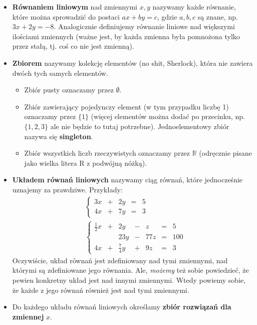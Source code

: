\documentclass{article}
\theoremstyle{remark}
\begin{document}
\begin{itemize}
  \item \textbf{Równaniem liniowym} nad zmiennymi $x, y$ 
  nazywamy każde równanie, które można sprowadzić do postaci
  $ax + by = c$, gdzie $a, b, c$ są znane, np. $3x+2y=-8$. 
  Analogicznie definiujemy równanie liniowe 
  nad większymi ilościami zmiennych 
  (ważne jest, by każda zmienna była pomnożona tylko przez
   stałą, tj. coś co nie jest zmienną).
  \item \textbf{Zbiorem} nazywamy kolekcję elementów (no shit, Sherlock), 
    która nie zawiera dwóch tych samych elementów.
  \begin{itemize}
    \item Zbiór pusty oznaczamy przez $\emptyset$.
    \item Zbiór zawierający pojedynczy element (w tym przypadku liczbę 1)
  oznaczamy przez $\{1\}$ (więcej elementów można dodać po przecinku, np. $\{1, 2, 3\}$
  ale nie będzie to tutaj potrzebne). Jednoelementowy zbiór nazywa się \textbf{singleton}.
    \item Zbiór wszystkich liczb rzeczywistych oznaczamy przez $\mathbb R$ 
  (odręcznie pisane jako wielka litera R z podwójną nóżką).
  \end{itemize}
  \item \textbf{Układem równań liniowych} nazywamy ciąg równań, które jednocześnie uznajemy za prawdziwe.
  Przykłady:
  \begin{align*}
    &\left\{ 
    \begin{array}{lllll}
      3x &+& 2y &=& 5\\
      4x &+& 7y &=& 3
    \end{array}
    \right. \\
    &\left\{ 
    \begin{array}{lllllll}
      \tfrac12x &+& 2y &-&z &=& 5\\
       && 23y &-&77z &=& 100\\
      4x &+& \tfrac74y &+&9z &=& 3
    \end{array}
    \right.
  \end{align*}
  Oczywiście, układ równań jest zdefiniowany nad tymi zmiennymi, nad 
  którymi są zdefiniowane jego równania. 
  Ale, \textit{możemy} też sobie powiedzieć, 
  że pewien konkretny układ jest nad innymi zmiennymi.
  Wtedy powiemy sobie, że każde z jego równań również
  jest nad tymi zmiennymi.
  \item Do każdego układu równań liniowych określamy \textbf{zbiór rozwiązań
  dla zmiennej} $x$. 

\end{itemize}
\end{document}
